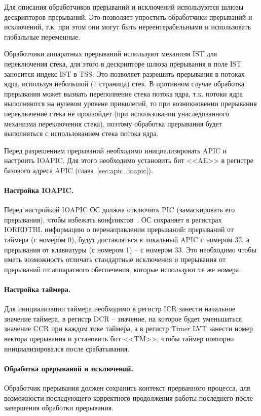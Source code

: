 Для описания обработчиков прерываний и исключений используются шлюзы дескрипторов прерываний.
Это позволяет упростить обработчики прерываний и исключений, т.к. при этом они могут быть
нереентерабельными и использовать глобальные переменные.

Обработчики аппаратных прерываний используют механизм IST для переключения стека, для этого
в дескрипторе шлюза прерывания в поле IST заносится индекс IST в TSS. Это позволяет
разрешить прерывания в потоках ядра, используя небольшой (1 страница) стек. В противном случае
обработка прерывания может вызвать переполнение стека потока ядра, т.к. потоки ядра выполняются
на нулевом уровене привилегий, то при возникновении прерывания переключение стека не произойдет
(при использовании унаследованного механизма переключения стека), поэтому обработка прерывания
будет выполняться с использованием стека потока ядра.

Перед разрешением прерываний необходимо инициализировать APIC и настроить IOAPIC. Для этого
необходимо установить бит <<AE>> в регистре базового адреса APIC (глава~\ref{sec:apic_ioapic}).

\paragraph{Настройка IOAPIC.} Перед настройкой IOAPIC ОС должна отключить PIC (замаскировать его прерывания),
чтобы избежать конфликтов~\cite{os_dev}. ОС сохраняет в регистрах IOREDTBL информацию о перенаправлении
прерываний: прерываний от таймера (с номером 0), будут доставляться в локальный APIC с номером 32, а прерывания от
клавиатуры (с номером 1) -- с номером 33. Это необходимо чтобы иметь возможность отличать стандартные исключения и
прерывания от прерываний от аппаратного обеспечения, которые используют те же номера.

\paragraph{Настройка таймера.} Для инициализации таймера необходимо в регистр ICR занести начальное значение
таймера, в регистр DCR -- значение, на которое будет уменьшаться значение CCR при каждом тике таймера,
а в регистр Timer LVT занести номер вектора прерывания и установить бит <<TM>>, чтобы таймер повторно
инициализировался после срабатывания.

\paragraph{Обработка прерываний и исключений.} Обработчик прерывания должен сохранить контекст прерванного
процесса, для возможности последующего корректного продолжения работы последнего после завершения обработки
прерывания.

